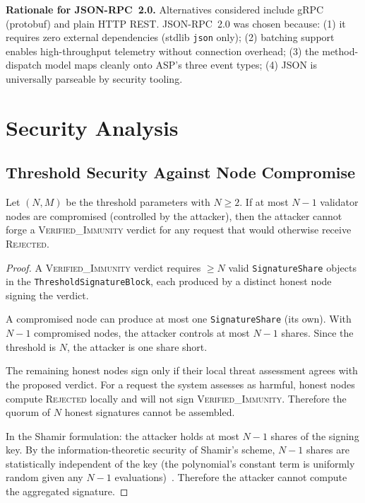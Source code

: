 \documentclass[sigconf,natbib=false]{acmart}
\begin{document}
\textbf{Rationale for JSON-RPC~2.0.}
Alternatives considered include gRPC (protobuf) and plain HTTP REST.
JSON-RPC~2.0 was chosen because: (1) it requires zero external dependencies
(stdlib \texttt{json} only); (2) batching support enables high-throughput
telemetry without connection overhead; (3) the method-dispatch model maps
cleanly onto ASP's three event types; (4) JSON is universally parseable by
security tooling.

\section{Security Analysis}
\label{sec:security}

\subsection{Threshold Security Against Node Compromise}
\label{sec:security:threshold}

\begin{theorem}
\label{thm:threshold}
Let $(N, M)$ be the threshold parameters with $N \geq 2$.
If at most $N-1$ validator nodes are compromised (controlled by the attacker),
then the attacker cannot forge a \textsc{Verified\_Immunity} verdict for
any request that would otherwise receive \textsc{Rejected}.
\end{theorem}

\begin{proof}
A \textsc{Verified\_Immunity} verdict requires $\geq N$ valid
\texttt{SignatureShare} objects in the \texttt{ThresholdSignatureBlock},
each produced by a distinct honest node signing the verdict.

A compromised node can produce at most one \texttt{SignatureShare} (its own).
With $N-1$ compromised nodes, the attacker controls at most $N-1$ shares.
Since the threshold is $N$, the attacker is one share short.

The remaining honest nodes sign only if their local threat assessment agrees
with the proposed verdict. For a request the system assesses as harmful,
honest nodes compute \textsc{Rejected} locally and will not sign
\textsc{Verified\_Immunity}. Therefore the quorum of $N$ honest signatures
cannot be assembled.

In the Shamir formulation: the attacker holds at most $N-1$ shares of the
signing key. By the information-theoretic security of Shamir's scheme,
$N-1$ shares are statistically independent of the key (the polynomial's
constant term is uniformly random given any $N-1$ evaluations)~\cite{shamir1979share}.
Therefore the attacker cannot compute the aggregated signature.
\end{proof}
\end{document}
